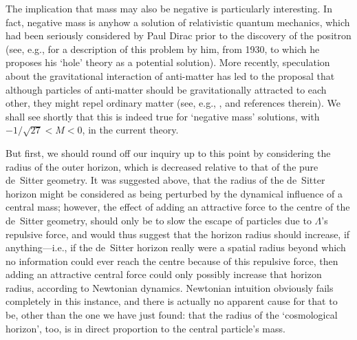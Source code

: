 The implication that mass may also be negative is particularly interesting. In fact, negative mass is anyhow a solution of relativistic quantum mechanics, which had been seriously considered by Paul Dirac prior to the discovery of the positron (see, e.g., \cite{Dirac1930a} for a description of this problem by him, from 1930, to which he proposes his `hole' theory as a potential solution). More recently, speculation about the gravitational interaction of anti-matter has led to the proposal that although particles of anti-matter should be gravitationally attracted to each other, they might repel ordinary matter (see, e.g., \cite{Villata2011a,Villata2011b}, and references therein). We shall see shortly that this is indeed true for `negative mass' solutions, with $-1/\sqrt{27}<M<0$, in the current theory.

But first, we should round off our inquiry up to this point by considering the radius of the outer horizon, which is decreased relative to that of the pure de~Sitter geometry. It was suggested above, that the radius of the de~Sitter horizon might be considered as being perturbed by the dynamical influence of a central mass; however, the effect of adding an attractive force to the centre of the de~Sitter geometry, should only be to slow the escape of particles due to $\Lambda$'s repulsive force, and would thus suggest that the horizon radius should increase, if anything---i.e., if the de~Sitter horizon really were a spatial radius beyond which no information could ever reach the centre because of this repulsive force, then adding an attractive central force could only possibly increase that horizon radius, according to Newtonian dynamics. Newtonian intuition obviously fails completely in this instance, and there is actually no apparent cause for that to be, other than the one we have just found: that the radius of the `cosmological horizon', too, is in direct proportion to the central particle's mass.


